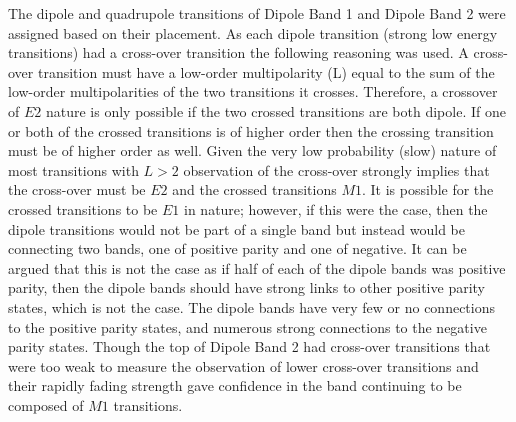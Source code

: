 The dipole and quadrupole transitions of Dipole Band 1 and Dipole Band 2 were assigned based on their placement. As each dipole transition (strong low energy transitions) had a cross-over transition the following reasoning was used. A cross-over transition must have a low-order multipolarity (L) equal to the sum of the low-order multipolarities of the two transitions it crosses. Therefore, a crossover of $E2$ nature is only possible if the two crossed transitions are both dipole. If one or both of the crossed transitions is of higher order then the crossing transition must be of higher order as well. Given the very low probability (slow) nature of most transitions with $L>2$ observation of the cross-over strongly implies that the cross-over must be $E2$ and the crossed transitions $M1$. It is possible for the crossed transitions to be $E1$ in nature; however, if this were the case, then the dipole transitions would not be part of a single band but instead would be connecting two bands, one of positive parity and one of negative. It can be argued that this is not the case as if half of each of the dipole bands was positive parity, then the dipole bands should have strong links to other positive parity states, which is not the case. The dipole bands have very few or no connections to the positive parity states, and numerous strong connections to the negative parity states. Though the top of Dipole Band 2 had cross-over transitions that were too weak to measure the observation of lower cross-over transitions and their rapidly fading strength gave confidence in the band continuing to be composed of $M1$ transitions.

